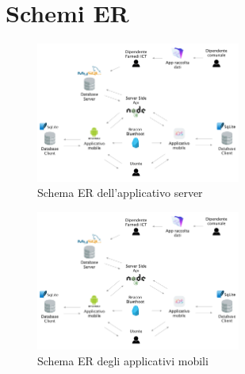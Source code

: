 \chapter{Schemi ER}

\begin{figure}[h]
\centering
\includegraphics[width=0.6\textwidth]{images/SchemaOpenAirMuseum.png}
\caption{Schema ER dell'applicativo server}
\end{figure}
				
\begin{figure}[h]
\centering
\includegraphics[width=0.6\textwidth]{images/SchemaOpenAirMuseum.png}
\caption{Schema ER degli applicativi mobili}
\end{figure}
